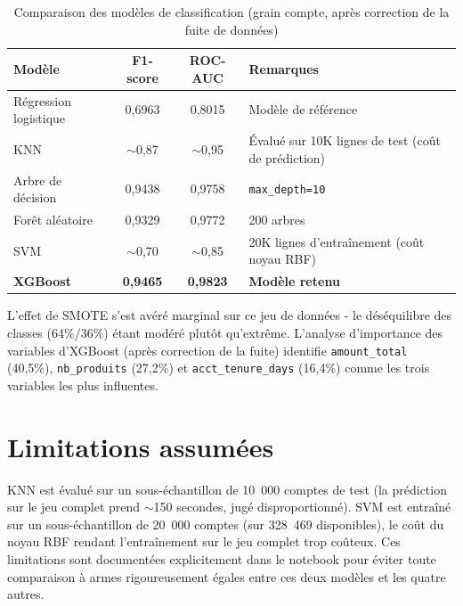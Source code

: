 \documentclass[11pt,a4paper]{report}
\begin{document}
\begin{table}[H]
\centering
\begin{tabular}{lccl}
\toprule
\textbf{Mod\`ele} & \textbf{F1-score} & \textbf{ROC-AUC} & \textbf{Remarques} \\
\midrule
R\'egression logistique & 0,6963 & 0,8015 & Mod\`ele de r\'ef\'erence \\
KNN & $\sim$0,87 & $\sim$0,95 & \'Evalu\'e sur 10K lignes de test (co\^ut de pr\'ediction) \\
Arbre de d\'ecision & 0,9438 & 0,9758 & \texttt{max\_depth=10} \\
For\^et al\'eatoire & 0,9329 & 0,9772 & 200 arbres \\
SVM & $\sim$0,70 & $\sim$0,85 & 20K lignes d'entra\^inement (co\^ut noyau RBF) \\
\textbf{XGBoost} & \textbf{0,9465} & \textbf{0,9823} & \textbf{Mod\`ele retenu} \\
\bottomrule
\end{tabular}
\caption{Comparaison des mod\`eles de classification (grain compte, apr\`es correction de la fuite de donn\'ees)}
\label{tab:ml-results}
\end{table}

L'effet de SMOTE s'est av\'er\'e marginal sur ce jeu de donn\'ees - le
d\'es\'equilibre des classes (64\%/36\%) \'etant mod\'er\'e plut\^ot qu'extr\^eme.
L'analyse d'importance des variables d'XGBoost (apr\`es correction de la fuite)
identifie \texttt{amount\_total} (40,5\%), \texttt{nb\_produits} (27,2\%) et
\texttt{acct\_tenure\_days} (16,4\%) comme les trois variables les plus
influentes.

\section{Limitations assum\'ees}

KNN est \'evalu\'e sur un sous-\'echantillon de 10~000 comptes de test (la
pr\'ediction sur le jeu complet prend $\sim$150 secondes, jug\'e
disproportionn\'e). SVM est entra\^in\'e sur un sous-\'echantillon de 20~000
comptes (sur 328~469 disponibles), le co\^ut du noyau RBF rendant
l'entra\^inement sur le jeu complet trop co\^uteux. Ces limitations sont
document\'ees explicitement dans le notebook pour \'eviter toute comparaison \`a
armes rigoureusement \'egales entre ces deux mod\`eles et les quatre autres.

\end{document}
